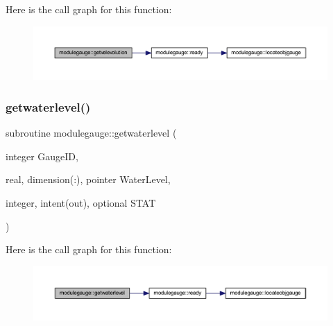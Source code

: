 Here is the call graph for this function\+:\nopagebreak
\begin{figure}[H]
\begin{center}
\leavevmode
\includegraphics[width=350pt]{namespacemodulegauge_af4997d45043f601c961fd7d153c0b413_cgraph}
\end{center}
\end{figure}
\mbox{\label{namespacemodulegauge_a0201de248a96f786a6ac1e9875435ba3}} 
\subsubsection{\texorpdfstring{getwaterlevel()}{getwaterlevel()}}
{\footnotesize\ttfamily subroutine modulegauge\+::getwaterlevel (\begin{DoxyParamCaption}\item[{integer}]{Gauge\+ID,  }\item[{real, dimension(\+:), pointer}]{Water\+Level,  }\item[{integer, intent(out), optional}]{S\+T\+AT }\end{DoxyParamCaption})\hspace{0.3cm}{\ttfamily [private]}}

Here is the call graph for this function\+:\nopagebreak
\begin{figure}[H]
\begin{center}
\leavevmode
\includegraphics[width=350pt]{namespacemodulegauge_a0201de248a96f786a6ac1e9875435ba3_cgraph}
\end{center}
\end{figure}
\mbox{\label{namespacemodulegauge_a0e2dffbc5ada081dc537e80f461ae0eb}} 
